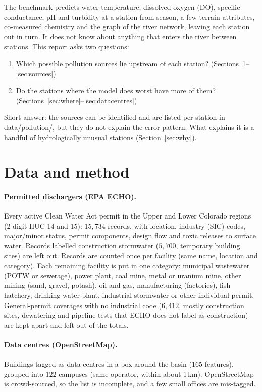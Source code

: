 \documentclass[11pt]{article}
\newcommand{\codeus}{\textunderscore\allowbreak}
\newcommand{\code}[1]{{\ttfamily\let\_\codeus #1}}
\begin{document}
The benchmark predicts water temperature, dissolved oxygen (DO), specific conductance, pH and
turbidity at a station from season, a few terrain attributes, co-measured chemistry and the graph
of the river network, leaving each station out in turn. It does not know about anything that
enters the river between stations. This report asks two questions:
\begin{enumerate}
  \item Which possible pollution sources lie upstream of each station?
        (Sections~\ref{sec:data}--\ref{sec:sources})
  \item Do the stations where the model does worst have more of them?
        (Sections~\ref{sec:where}--\ref{sec:datacentres})
\end{enumerate}
Short answer: the sources can be identified and are listed per station in
\code{data/pollution/}, but they do not explain the error pattern. What explains it is a handful of
hydrologically unusual stations (Section~\ref{sec:why}).

\section{Data and method}\label{sec:data}

\paragraph{Permitted dischargers (EPA ECHO).} Every active Clean Water Act permit in the Upper and
Lower Colorado regions (2-digit HUC 14 and 15): $15{,}734$ records, with location, industry (SIC)
codes, major/minor status, permit components, design flow and toxic releases to surface water.
Records labelled construction stormwater ($5{,}700$, temporary building sites) are left out.
Records are counted once per facility (same name, location and category). Each remaining facility
is put in one category: municipal wastewater (POTW or sewerage), power plant, coal mine, metal or
uranium mine, other mining (sand, gravel, potash), oil and gas, manufacturing (factories), fish
hatchery, drinking-water plant, industrial stormwater or other individual permit. General-permit
coverages with no industrial code ($6{,}412$, mostly construction sites, dewatering and pipeline
tests that ECHO does not label as construction) are kept apart and left out of the totals.

\paragraph{Data centres (OpenStreetMap).} Buildings tagged as data centres in a box around the basin
($165$ features), grouped into $122$ campuses (same operator, within about 1\,km). OpenStreetMap is
crowd-sourced, so the list is incomplete, and a few small offices are mis-tagged.
\end{document}
